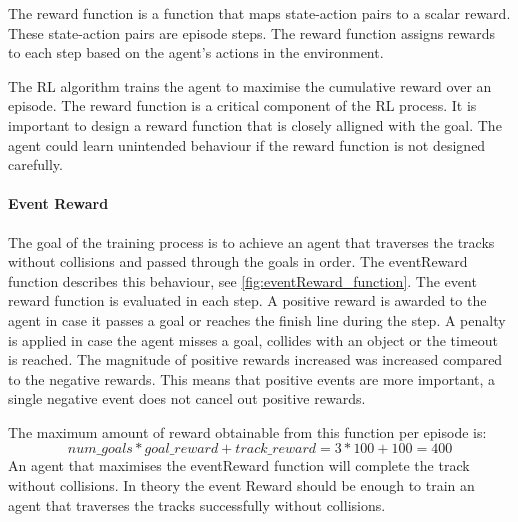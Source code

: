 The reward function is a function that maps state-action pairs to a scalar reward. These state-action pairs are episode steps. The reward function assigns rewards to each step based on the agent's actions in the environment.

The \ac{RL} algorithm trains the agent to maximise the cumulative reward over an episode. The reward function is a critical component of the \ac{RL} process. It is important to design a reward function that is closely alligned with the goal. The agent could learn unintended behaviour if the reward function is not designed carefully.

\paragraph*{Event Reward}
The goal of the training process is to achieve an agent that traverses the tracks without collisions and passed through the goals in order. The eventReward function describes this behaviour, see \ref{fig:eventReward_function}. The event reward function is evaluated in each step. A positive reward is awarded to the agent in case it passes a goal or reaches the finish line during the step. A penalty is applied in case the agent misses a goal, collides with an object or the timeout is reached. The magnitude of positive rewards increased was increased compared to the negative rewards. This means that positive events are more important, a single negative event does not cancel out positive rewards.

The maximum amount of reward obtainable from this function per episode is: \[num\_goals * goal\_reward + track\_reward = 3 * 100 + 100 = 400\] An agent that maximises the eventReward function will complete the track without collisions. In theory the event Reward should be enough to train an agent that traverses the tracks successfully without collisions.


